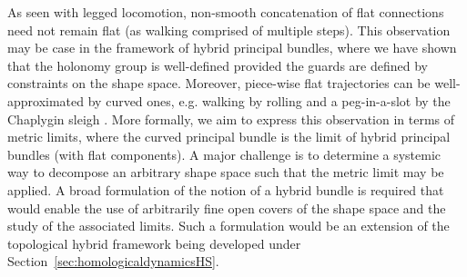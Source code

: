 \documentclass[letterpaper,11pt]{article}
\newcommand{\dg}[1]{{\textcolor{blue}{#1}}}
\begin{document}
As seen with legged locomotion, non-smooth concatenation of flat connections need not remain flat (as walking comprised of multiple steps). This observation may be case in the framework of hybrid principal bundles, where we have shown that the holonomy group is well-defined provided the guards are defined by constraints on the shape space. Moreover, piece-wise flat trajectories can be well-approximated by curved ones, e.g. walking by rolling and a peg-in-a-slot by the Chaplygin sleigh \cite{hybrid_holonomy}. More formally, we aim to express this observation in terms of metric limits, where the curved principal bundle is the limit of hybrid principal bundles (with flat components). A major challenge is to determine a systemic way to decompose an arbitrary shape space such that the metric limit may be applied. A broad formulation of the notion of a hybrid bundle is required that would enable the use of arbitrarily fine open covers of the shape space and the study of the associated limits. Such a formulation would be an extension of the topological hybrid framework being developed under Section~\ref{sec:homologicaldynamicsHS}.


\end{document}
